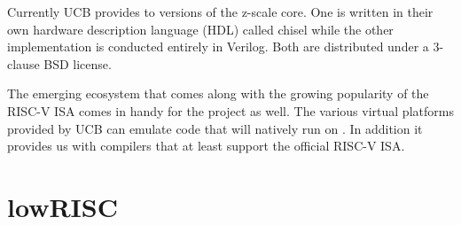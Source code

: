 Currently UCB provides to versions of the z-scale core. One is written in their own hardware description language (HDL) called chisel 
while the other implementation is conducted entirely in Verilog. Both are distributed under a 3-clause BSD license.

The emerging ecosystem that comes along with the growing popularity of the RISC-V ISA comes in handy for the \pulpino project as well. 
The various virtual platforms provided by UCB can emulate code that will natively run on \pulpino. In addition it provides us with 
compilers that at least support the official RISC-V ISA.

\section{lowRISC}
